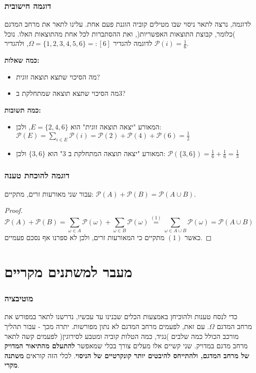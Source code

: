\documentclass{article}
\newcommand{\Pp}{\ensuremath{\mathcal{P}}}
\newcommand{\nim}{\stackrel}
\begin{document}
\subsubsection{דוגמה חישובית}
 לדוגמה, נרצה לתאר ניסוי שבו מטילים קוביה הוגנת פעם אחת. עלינו לתאר את מרחב המדגם )כלומר,  קבוצת התוצאות האפשריות(, ואת ההסתברות לכל אחת מהתוצאות האלו. נוכל לדוגמה להגדיר
$\Omega = \{1,2,3,4,5,6\} =: [6]$, ולהגדיר
$\Pp(i) = \frac{1}{6}$. 

\textbf{כמה שאלות:}
\begin{itemize}
\item מה הסיכוי שתצא תוצאה זוגית?
\item מה הסיכוי שתצא תוצאה שמתחלקת ב$3$?
\end{itemize}
\textbf{כמה תשובות:}
\begin{itemize}
\item המאורע "יצאה תוצאה זוגית" הוא 
$E = \{2,4,6\}$, ולכן:
$\Pp(E) = \sum_{i\in E} \Pp(i) = \Pp(2) + \Pp(4) + \Pp(6) = \frac{1}{2}$
\item המאורע "יצאה תוצאה המתחלקת ב
$3$" הוא $\{3,6\}$ ולכן:
$\Pp(\{3,6\}) = \frac{1}{6} + \frac{1}{6} = \frac{1}{3}$
\end{itemize}
\subsubsection{דוגמה להוכחת טענה}
עבור שני מאורעות זרים, מתקיים: $\Pp(A) + \Pp(B) = \Pp(A\cup B)$.
\begin{proof}
$$\Pp(A) + \Pp(B) = \sum_{\omega\in A} \Pp(\omega) + \sum_{\omega\in B} \Pp(\omega) \nim{(1)}= \sum_{\omega\in A\cup B} \Pp(\omega) = \Pp(A\cup B)$$
כאשר $(1)$ מתקיים כי המאורעות זרים, ולכן לא ספרנו אף נסכם פעמיים.
\end{proof}

\section*{מעבר למשתנים מקריים}
\subsubsection*{מוטיבציה}
כדי לנסח טענות ולהוכיחן באמצעות הכלים שבנינו עד עכשיו, נדרשנו לתאר במפורש את מרחב המדגם $\Omega$. עם זאת, לפעמים מרחב המדגם לא נתון מפורשות. יתרה מכך - עבור תהליך מורכב הכולל כמה שלבים )נגיד, כמה הטלות קוביה ומטבע לסירוגין( לפעמים קשה לתאר מרחב מדגם במדויק. שני קשיים אלו מעלים צורך בכלי שמאפשר \textbf{להתעלם מהתיאור המדויק של מרחב המדגם, ולהתייחס להיבטים יותר קונקרטיים של הניסוי}. לכלי הזה קוראים \textbf{משתנה מקרי}.
\end{document}
